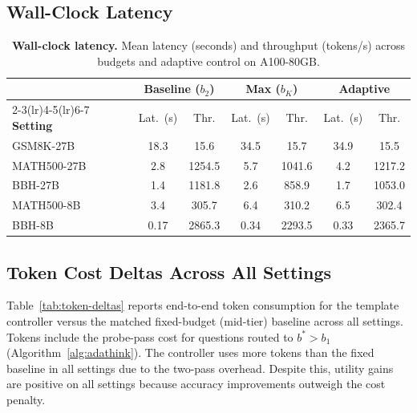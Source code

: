 \subsection{Wall-Clock Latency}
\label{app:latency}

\begin{table}[ht]
\centering
\caption{\textbf{Wall-clock latency.} Mean latency (seconds) and throughput (tokens/s) across budgets and adaptive control on A100-80GB.}
\label{tab:latency}
\small
\begin{tabular}{@{}lcccccc@{}}
\toprule
& \multicolumn{2}{c}{\textbf{Baseline ($b_2$)}} & \multicolumn{2}{c}{\textbf{Max ($b_K$)}} & \multicolumn{2}{c}{\textbf{Adaptive}} \\
\cmidrule(lr){2-3}\cmidrule(lr){4-5}\cmidrule(lr){6-7}
\textbf{Setting} & Lat.\ (s) & Thr. & Lat.\ (s) & Thr. & Lat.\ (s) & Thr. \\
\midrule
GSM8K-27B & 18.3 & 15.6 & 34.5 & 15.7 & 34.9 & 15.5 \\
MATH500-27B & 2.8 & 1254.5 & 5.7 & 1041.6 & 4.2 & 1217.2 \\
BBH-27B & 1.4 & 1181.8 & 2.6 & 858.9 & 1.7 & 1053.0 \\
MATH500-8B & 3.4 & 305.7 & 6.4 & 310.2 & 6.5 & 302.4 \\
BBH-8B & 0.17 & 2865.3 & 0.34 & 2293.5 & 0.33 & 2365.7 \\
\bottomrule
\end{tabular}
\end{table}

\subsection{Token Cost Deltas Across All Settings}
\label{app:token-deltas}

Table~\ref{tab:token-deltas} reports end-to-end token consumption for the template controller versus the matched fixed-budget (mid-tier) baseline across all settings.
Tokens include the probe-pass cost for questions routed to $b^* > b_1$ (Algorithm~\ref{alg:adathink}).
The controller uses more tokens than the fixed baseline in all settings due to the two-pass overhead.
Despite this, utility gains are positive on all settings because accuracy improvements outweigh the cost penalty.

